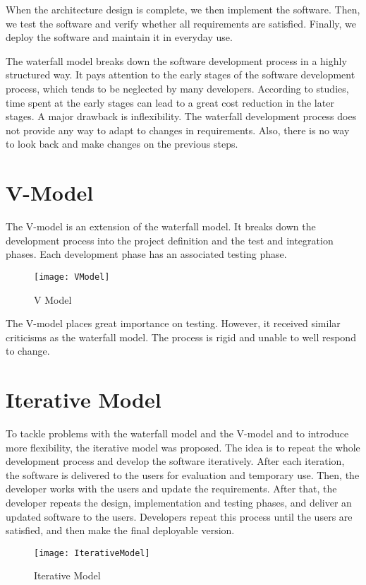 When the architecture design is complete, we then implement the software. Then, we test the software and verify whether all requirements are satisfied. Finally, we deploy the software and maintain it in everyday use.

The waterfall model breaks down the software development process in a highly structured way. It pays attention to the early stages of the software development process, which tends to be neglected by many developers. According to studies, time spent at the early stages can lead to a great cost reduction in the later stages. A major drawback is inflexibility. The waterfall development process does not provide any way to adapt to changes in requirements. Also, there is no way to look back and make changes on the previous steps.

\section{V-Model}
The V-model is an extension of the waterfall model. It breaks down the development process into the project definition and the test and integration phases. Each development phase has an associated testing phase.

\begin{figure}[htbp]
\centering
\texttt{[image: VModel]}
\caption{V Model\label{fig:V Model}}
\end{figure}

The V-model places great importance on testing. However, it received similar criticisms as the waterfall model. The process is rigid and unable to well respond to change.

\section{Iterative Model}
To tackle problems with the waterfall model and the V-model and to introduce more flexibility, the iterative model was proposed. The idea is to repeat the whole development process and develop the software iteratively. After each iteration, the software is delivered to the users for evaluation and temporary use. Then, the developer works with the users and update the requirements. After that, the developer repeats the design, implementation and testing phases, and deliver an updated software to the users. Developers repeat this process until the users are satisfied, and then make the final deployable version.

\begin{figure}[htbp]
\centering
\texttt{[image: IterativeModel]}
\caption{Iterative Model\label{fig:Iterative Model}}
\end{figure}

